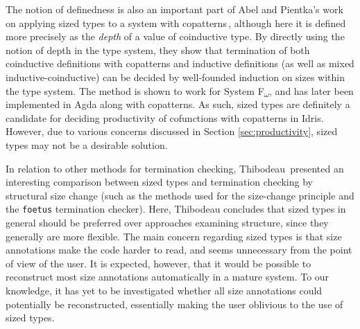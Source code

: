 The notion of definedness is also an important part of Abel and Pientka's work on applying sized types to a system with copatterns\,\citep{Abel13Wellfounded}, although here it is defined more precisely as the \emph{depth} of a value of coinductive type. By directly using the notion of depth in the type system, they show that termination of both coinductive definitions with copatterns and inductive definitions (as well as mixed inductive-coinductive) can be decided by well-founded induction on sizes within the type system. The method is shown to work for System F\textsubscript{$\omega$}, and has later been implemented in Agda along with copatterns. As such, sized types are definitely a candidate for deciding productivity of cofunctions with copatterns in Idris. However, due to various concerns discussed in Section \ref{sec:productivity}, sized types may not be a desirable solution.

In relation to other methods for termination checking, Thibodeau\,\citep{Thibodeau11} presented an interesting comparison between sized types and termination checking by structural size change (such as the methods used for the size-change principle and the \texttt{foetus} termination checker). Here, Thibodeau concludes that sized types in general should be preferred over approaches examining structure, since they generally are more flexible. The main concern regarding sized types is that size annotations make the code harder to read, and seems unnecessary from the point of view of the user. It is expected, however, that it would be possible to reconstruct most size annotations automatically in a mature system. To our knowledge, it has yet to be investigated whether all size annotations could potentially be reconstructed, essentially making the user oblivious to the use of sized types.

